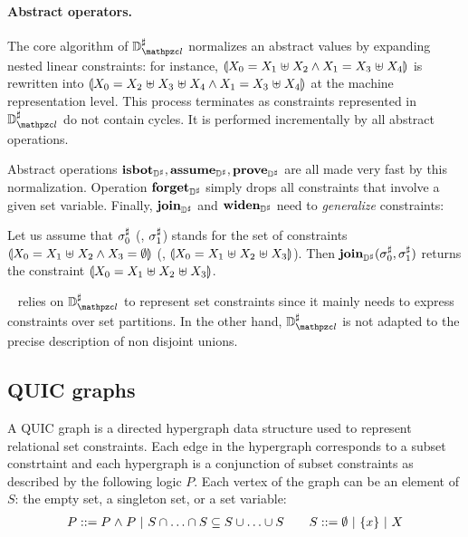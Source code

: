 \paragraph{Abstract operators.}
The core algorithm of \( \adomlin \) normalizes an abstract values by
expanding nested linear constraints:
for instance, \( \llparenthesis X_0 = X_1 \mathrel{\uplus} X_2 \wedge
  X_1 = X_3 \mathrel{\uplus} X_4 \rrparenthesis \) is rewritten into
\( \llparenthesis X_0 = X_2 \mathrel{\uplus} X_3 \mathrel{\uplus} X_4 \wedge
  X_1 = X_3 \mathrel{\uplus} X_4 \rrparenthesis \) at the machine representation
level.
This process terminates as constraints represented in \( \adomlin \)
do not contain cycles.
It is performed incrementally by all abstract operations.

Abstract operations \( \textbf{isbot}_{{\mathbb{D}}^{\sharp}}, \textbf{assume}_{{\mathbb{D}}^{\sharp}}, \textbf{prove}_{{\mathbb{D}}^{\sharp}} \) are all
made very fast by this normalization.
Operation \( \textbf{forget}_{{\mathbb{D}}^{\sharp}} \) simply drops all constraints that involve
a given set variable.
Finally, \( \textbf{join}_{{\mathbb{D}}^{\sharp}} \) and \( \textbf{widen}_{{\mathbb{D}}^{\sharp}} \) need to {\em generalize}
constraints:
\begin{example}
  Let us assume that \( {\sigma}^{\sharp}_0 \) (\resp, \( {\sigma}^{\sharp}_1 \)) stands for
  the set of constraints \( \llparenthesis X_0 = X_1 \mathrel{\uplus} X_2
    \wedge X_3 = \emptyset \rrparenthesis \) (\resp, \( \llparenthesis X_0 = X_1
    \mathrel{\uplus} X_2 \mathrel{\uplus} X_3 \rrparenthesis \)).
  Then \( \textbf{join}_{{\mathbb{D}}^{\sharp}}( {\sigma}^{\sharp}_0, {\sigma}^{\sharp}_1 ) \) returns the constraint
  \( \llparenthesis X_0 = X_1 \mathrel{\uplus} X_2 \mathrel{\uplus} X_3 \rrparenthesis \).
\end{example}
\memcad~\cite{memcad:15:sas} relies on \( \adomlin \) to represent set
constraints since it mainly needs to express constraints over set
partitions.
In the other hand, \( \adomlin \) is not adapted to the precise
description of non disjoint unions.

\subsection{QUIC graphs}
\label{s:4:2:quic}

A QUIC graph is a directed hypergraph data structure used to represent relational set constraints.  Each edge in the hypergraph corresponds to a subset constrtaint and each hypergraph is a conjunction of subset constraints as described by the following logic $P$.  Each vertex of the graph can be an element of $S$: the empty set, a singleton set, or a set variable:
\begin{align*}
  P ::= P \mathrel{\wedge} P \ | \ S \cap \ldots \cap S \subseteq S \cup \ldots \cup S \qquad
  S ::= \emptyset \ | \ \{x\} \ | \ X
\end{align*}

